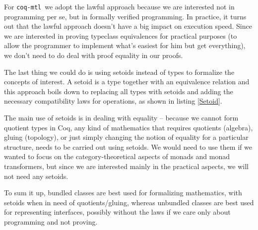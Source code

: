 \documentclass[declaration,inz,english,shortabstract]{iithesis}
\newcommand{\libname}{\m{coq-mtl}}
\newcommand{\m}[1]{\texttt{#1}}
\begin{document}
For \libname\ we adopt the lawful approach because we are interested not in programming per se, but in formally verified programming. In practice, it turns out that the lawful approach doesn't have a big impact on execution speed. Since we are interested in proving typeclass equivalences for practical purposes (to allow the programmer to implement what's easiest for him but get everything), we don't need to do deal with proof equality in our proofs.


The last thing we could do is using setoids instead of types to formalize the concepts of interest. A setoid is a type together with an equivalence relation and this approach boils down to replacing all types with setoids and adding the necessary compatibility laws for operations, as shown in listing \ref{Setoid}.

The main use of setoids is in dealing with equality -- because we cannot form quotient types in Coq, any kind of mathematics that requires quotients (algebra), gluing (topology), or just simply changing the notion of equality for a particular structure, needs to be carried out using setoids. We would need to use them if we wanted to focus on the category-theoretical aspects of monads and monad transformers, but since we are interested mainly in the practical aspects, we will not need any setoids.

To sum it up, bundled classes are best used for formalizing mathematics, with setoids when in need of quotients/gluing, whereas unbundled classes are best used for representing interfaces, possibly without the laws if we care only about programming and not proving.
\end{document}

